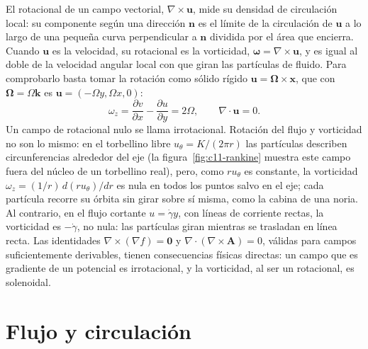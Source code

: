 \documentclass[10pt,openany]{book}
\begin{document}
El rotacional de un campo vectorial, \(\nabla\times\mathbf{u}\), mide su densidad de circulación local: su componente según una dirección \(\mathbf{n}\) es el límite de la circulación de \(\mathbf{u}\) a lo largo de una pequeña curva perpendicular a \(\mathbf{n}\) dividida por el área que encierra. Cuando \(\mathbf{u}\) es la velocidad, su rotacional es la vorticidad, \(\boldsymbol{\omega} = \nabla\times\mathbf{u}\), y es igual al doble de la velocidad angular local con que giran las partículas de fluido. Para comprobarlo basta tomar la rotación como sólido rígido \(\mathbf{u} = \boldsymbol{\Omega}\times\mathbf{x}\), que con \(\boldsymbol{\Omega} = \Omega\mathbf{k}\) es \(\mathbf{u} = (-\Omega y, \Omega x, 0)\):
\begin{equation}
\omega_z = \frac{\partial v}{\partial x} - \frac{\partial u}{\partial y} = 2\Omega, \qquad \nabla\cdot\mathbf{u} = 0. \label{eq:c11-rigido}
\end{equation}
Un campo de rotacional nulo se llama irrotacional. Rotación del flujo y vorticidad no son lo mismo: en el torbellino libre \(u_\theta = K/(2\pi r)\) las partículas describen circunferencias alrededor del eje (la figura~\ref{fig:c11-rankine} muestra este campo fuera del núcleo de un torbellino real), pero, como \(r u_\theta\) es constante, la vorticidad \(\omega_z = (1/r)\,d(r u_\theta)/dr\) es nula en todos los puntos salvo en el eje; cada partícula recorre su órbita sin girar sobre sí misma, como la cabina de una noria. Al contrario, en el flujo cortante \(u = \dot\gamma y\), con líneas de corriente rectas, la vorticidad es \(-\dot\gamma\), no nula: las partículas giran mientras se trasladan en línea recta. Las identidades \(\nabla\times(\nabla f) = \mathbf{0}\) y \(\nabla\cdot(\nabla\times\mathbf{A}) = 0\), válidas para campos suficientemente derivables, tienen consecuencias físicas directas: un campo que es gradiente de un potencial es irrotacional, y la vorticidad, al ser un rotacional, es solenoidal.

\section{Flujo y circulación}
\end{document}
